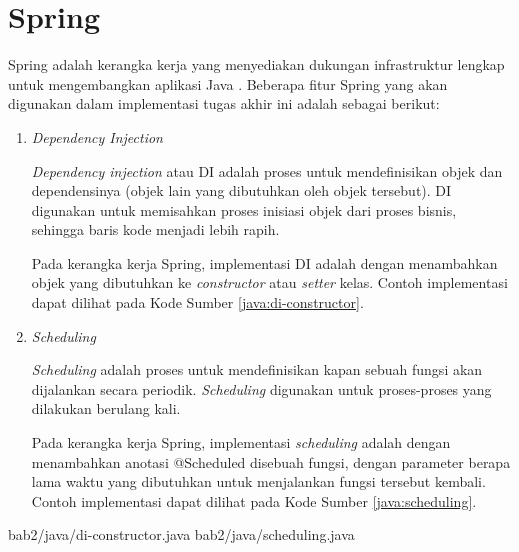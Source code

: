 \section{Spring}
\par Spring adalah kerangka kerja yang menyediakan dukungan infrastruktur lengkap untuk mengembangkan aplikasi Java \cite{spring-online}. Beberapa fitur Spring yang akan digunakan dalam implementasi tugas akhir ini adalah sebagai berikut:
\begin{enumerate}[listparindent=2.5em]
	\item \textit{Dependency Injection}
	\par \textit{Dependency injection} atau DI adalah proses untuk mendefinisikan objek dan dependensinya (objek lain yang dibutuhkan oleh objek tersebut). DI digunakan untuk memisahkan proses inisiasi objek dari proses bisnis, sehingga baris kode menjadi lebih rapih.
	\par Pada kerangka kerja Spring, implementasi DI adalah dengan menambahkan objek yang dibutuhkan ke \textit{constructor} atau \textit{setter} kelas. Contoh implementasi dapat dilihat pada Kode Sumber \ref{java:di-constructor}.
	\item \textit{Scheduling}
	\par \textit{Scheduling} adalah proses untuk mendefinisikan kapan sebuah fungsi akan dijalankan secara periodik. \textit{Scheduling} digunakan untuk proses-proses yang dilakukan berulang kali.
	\par Pada kerangka kerja Spring, implementasi \textit{scheduling} adalah dengan menambahkan anotasi @Scheduled disebuah fungsi, dengan parameter berapa lama waktu yang dibutuhkan untuk menjalankan fungsi tersebut kembali. Contoh implementasi dapat dilihat pada Kode Sumber \ref{java:scheduling}.
\end{enumerate}
 {bab2/java/di-constructor.java}
 {bab2/java/scheduling.java}


